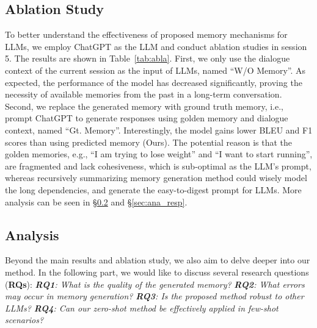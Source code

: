 \documentclass[authoryear,preprint,review,12pt]{elsarticle}
\begin{document}
\subsection{Ablation Study}
To better understand the effectiveness of proposed memory mechanisms for LLMs, we employ ChatGPT as the LLM and conduct ablation studies in session 5. The results are shown in Table~\ref{tab:abla}. First, we only use the dialogue context of the current session as the input of LLMs, named ``W/O Memory''. As expected, the performance of the model has decreased significantly, proving the necessity of available memories from the past in a long-term conversation. Second, we replace the generated memory with ground truth memory, i.e., prompt ChatGPT to generate responses using golden memory and dialogue context, named ``Gt. Memory''. Interestingly, the model gains lower BLEU and F1 scores than using predicted memory (Ours). The potential reason is that the golden memories, e.g., ``I am trying to lose weight'' and ``I want to start running'', are fragmented and lack cohesiveness, which is sub-optimal as the LLM's prompt, whereas recursively summarizing memory generation method could wisely model the long dependencies, and generate the easy-to-digest prompt for LLMs. More analysis can be seen in \S\ref{sec:ana_mem} and \S\ref{sec:ana_resp}.
\begin{table}[t]
\centering
\caption{\textbf{The ablation study on memory} in MSC dataset.}
\label{tab:abla}

\end{table}

\subsection{Analysis}
\label{sec:ana_mem}
Beyond the main results and ablation study, we also aim to delve deeper into our method. In the following part, we would like to discuss several research questions (\textbf{RQs}): \textit{\textbf{RQ1}: What is the quality of the generated memory?} \textit{\textbf{RQ2}: What errors may occur in memory generation?} \textit{\textbf{RQ3}: Is the proposed method robust to other LLMs?} \textit{\textbf{RQ4}: Can our zero-shot method be effectively applied in few-shot scenarios?}
  
\end{document}
